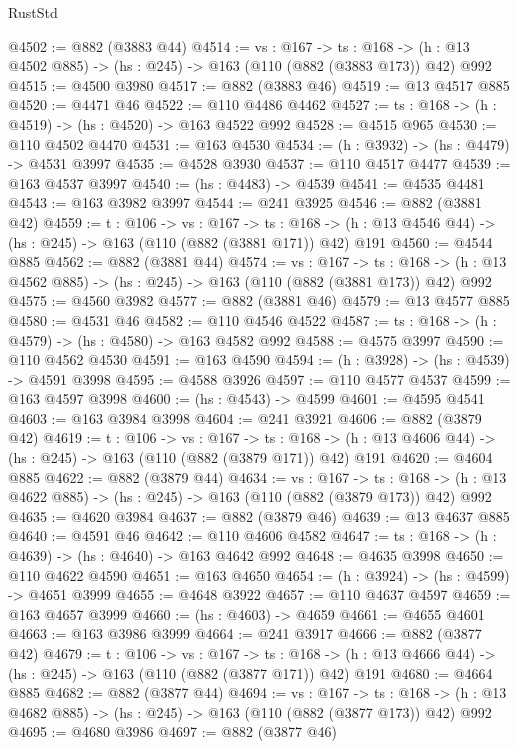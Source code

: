 \begin{lexlean}{RustStd}
\begin{coremodule}
@4502 := @882 (@3883 @44)
@4514 := {vs : @167} ->
  {ts : @168} -> (h : @13 @4502 @885) -> (hs : @245) -> @163 (@110 (@882 (@3883 @173)) @42) @992
@4515 := @4500 @3980
@4517 := @882 (@3883 @46)
@4519 := @13 @4517 @885
@4520 := @4471 @46
@4522 := @110 @4486 @4462
@4527 := {ts : @168} -> (h : @4519) -> (hs : @4520) -> @163 @4522 @992
@4528 := @4515 @965
@4530 := @110 @4502 @4470
@4531 := @163 @4530
@4534 := (h : @3932) -> (hs : @4479) -> @4531 @3997
@4535 := @4528 @3930
@4537 := @110 @4517 @4477
@4539 := @163 @4537 @3997
@4540 := (hs : @4483) -> @4539
@4541 := @4535 @4481
@4543 := @163 @3982 @3997
@4544 := @241 @3925
@4546 := @882 (@3881 @42)
@4559 := {t : @106} ->
  {vs : @167} ->
  {ts : @168} -> (h : @13 @4546 @44) -> (hs : @245) -> @163 (@110 (@882 (@3881 @171)) @42) @191
@4560 := @4544 @885
@4562 := @882 (@3881 @44)
@4574 := {vs : @167} ->
  {ts : @168} -> (h : @13 @4562 @885) -> (hs : @245) -> @163 (@110 (@882 (@3881 @173)) @42) @992
@4575 := @4560 @3982
@4577 := @882 (@3881 @46)
@4579 := @13 @4577 @885
@4580 := @4531 @46
@4582 := @110 @4546 @4522
@4587 := {ts : @168} -> (h : @4579) -> (hs : @4580) -> @163 @4582 @992
@4588 := @4575 @3997
@4590 := @110 @4562 @4530
@4591 := @163 @4590
@4594 := (h : @3928) -> (hs : @4539) -> @4591 @3998
@4595 := @4588 @3926
@4597 := @110 @4577 @4537
@4599 := @163 @4597 @3998
@4600 := (hs : @4543) -> @4599
@4601 := @4595 @4541
@4603 := @163 @3984 @3998
@4604 := @241 @3921
@4606 := @882 (@3879 @42)
@4619 := {t : @106} ->
  {vs : @167} ->
  {ts : @168} -> (h : @13 @4606 @44) -> (hs : @245) -> @163 (@110 (@882 (@3879 @171)) @42) @191
@4620 := @4604 @885
@4622 := @882 (@3879 @44)
@4634 := {vs : @167} ->
  {ts : @168} -> (h : @13 @4622 @885) -> (hs : @245) -> @163 (@110 (@882 (@3879 @173)) @42) @992
@4635 := @4620 @3984
@4637 := @882 (@3879 @46)
@4639 := @13 @4637 @885
@4640 := @4591 @46
@4642 := @110 @4606 @4582
@4647 := {ts : @168} -> (h : @4639) -> (hs : @4640) -> @163 @4642 @992
@4648 := @4635 @3998
@4650 := @110 @4622 @4590
@4651 := @163 @4650
@4654 := (h : @3924) -> (hs : @4599) -> @4651 @3999
@4655 := @4648 @3922
@4657 := @110 @4637 @4597
@4659 := @163 @4657 @3999
@4660 := (hs : @4603) -> @4659
@4661 := @4655 @4601
@4663 := @163 @3986 @3999
@4664 := @241 @3917
@4666 := @882 (@3877 @42)
@4679 := {t : @106} ->
  {vs : @167} ->
  {ts : @168} -> (h : @13 @4666 @44) -> (hs : @245) -> @163 (@110 (@882 (@3877 @171)) @42) @191
@4680 := @4664 @885
@4682 := @882 (@3877 @44)
@4694 := {vs : @167} ->
  {ts : @168} -> (h : @13 @4682 @885) -> (hs : @245) -> @163 (@110 (@882 (@3877 @173)) @42) @992
@4695 := @4680 @3986
@4697 := @882 (@3877 @46)

\end{coremodule}
\end{lexlean}
